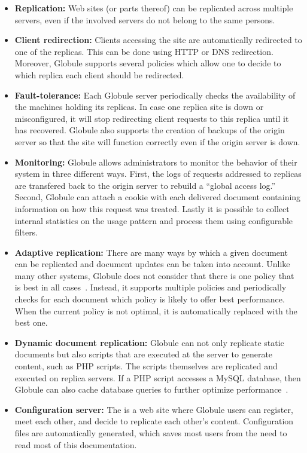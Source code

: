 \documentclass[10pt,a4paper]{article}
\begin{document}
\begin{itemize}
\item{\textbf{Replication:}} Web sites (or parts thereof) can be replicated
  across multiple servers, even if the involved servers do not belong to the
  same persons.
\item{\textbf{Client redirection:}} Clients accessing the site are
  automatically redirected to one of the replicas. This can be done using HTTP
  or DNS redirection. Moreover, Globule supports several policies which allow
  one to decide to which replica each client should be redirected.
\item{\textbf{Fault-tolerance:}} Each Globule server periodically checks the
  availability of the machines holding its replicas. In case one replica site
  is down or misconfigured, it will stop redirecting client requests to this
  replica until it has recovered. Globule also supports the creation of
  backups of the origin server so that the site will function correctly even
  if the origin server is down.
\item{\textbf{Monitoring:}} Globule allows administrators to monitor the
  behavior of their system in three different ways. First, the logs of
  requests addressed to replicas are transfered back to the origin server to
  rebuild a ``global access log.'' Second, Globule can attach a cookie with
  each delivered document containing information on how this request was
  treated.  Lastly it is possible to collect internal statistics on the usage
  pattern and process them using configurable filters.
\item{\textbf{Adaptive replication:}} There are many ways by which a given
  document can be replicated and document updates can be taken into
  account. Unlike many other systems, Globule does not consider that there is
  one policy that is best in all cases~\cite{pierre2002a}.  Instead, it
  supports multiple policies and periodically checks for each document which
  policy is likely to offer best performance. When the current policy is not
  optimal, it is automatically replaced with the best one.
\item{\textbf{Dynamic document replication:}} Globule can not only replicate
  static documents but also scripts that are executed at the server to
  generate content, such as PHP scripts.  The scripts themselves are
  replicated and executed on replica servers.  If a PHP script accesses a
  MySQL database, then Globule can also cache database queries to further
  optimize performance~\cite{swami2005c}.
\item{\textbf{Configuration server:}} The
   is a web
  site where Globule users can register, meet each other, and decide to
  replicate each other's content.  Configuration files are automatically
  generated, which saves most users from the need to read most of this
  documentation.
\end{itemize}
\end{document}
